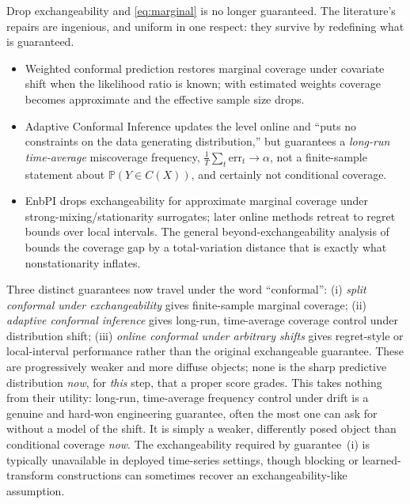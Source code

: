 \documentclass[10pt]{article} %
\theoremstyle{definition}
\renewcommand{\Pr}{\mathbb{P}}
\begin{document}
Drop exchangeability and \eqref{eq:marginal} is no longer guaranteed. The literature's
repairs are ingenious, and uniform in one respect: they survive by redefining what is
guaranteed.
\begin{itemize}
  \item Weighted conformal prediction \citep{tibshirani2019conformal} restores
  marginal coverage under covariate shift when the likelihood ratio is known; with
  estimated weights coverage becomes approximate and the effective sample size drops.
  \item Adaptive Conformal Inference \citep{gibbs2021adaptive} updates the level
  online and ``puts no constraints on the data generating distribution,'' but guarantees
  a \emph{long-run time-average} miscoverage frequency,
  $\frac1T\sum_t \mathrm{err}_t\to\alpha$, not a finite-sample statement about
  $\Pr(Y\in C(X))$, and certainly not conditional coverage.
  \item EnbPI \citep{xu2021conformal} drops exchangeability for approximate
  marginal coverage under strong-mixing/stationarity surrogates; later online methods
  \citep{zaffran2022adaptive,gibbs2024conformal} retreat to regret bounds over local
  intervals. The general beyond-exchangeability analysis of \citet{barber2023conformal}
  bounds the coverage gap by a total-variation distance that is exactly what
  nonstationarity inflates.
\end{itemize}
Three distinct guarantees now travel under the word ``conformal'':
(i) \emph{split conformal under exchangeability} gives finite-sample marginal coverage;
(ii) \emph{adaptive conformal inference} gives long-run, time-average coverage control
under distribution shift; (iii) \emph{online conformal under arbitrary shifts} gives
regret-style or local-interval performance rather than the original exchangeable
guarantee. These are progressively weaker and more diffuse objects; none is the sharp
predictive distribution \emph{now}, for \emph{this} step, that a proper score grades. This
takes nothing from their utility: long-run, time-average frequency control under drift is a
genuine and hard-won engineering guarantee, often the most one can ask for without a model
of the shift. It is simply a weaker, differently posed object than conditional coverage
\emph{now}. The exchangeability required by guarantee~(i) is typically unavailable in deployed
time-series settings, though blocking or learned-transform constructions can sometimes
recover an exchangeability-like assumption.
\end{document}
